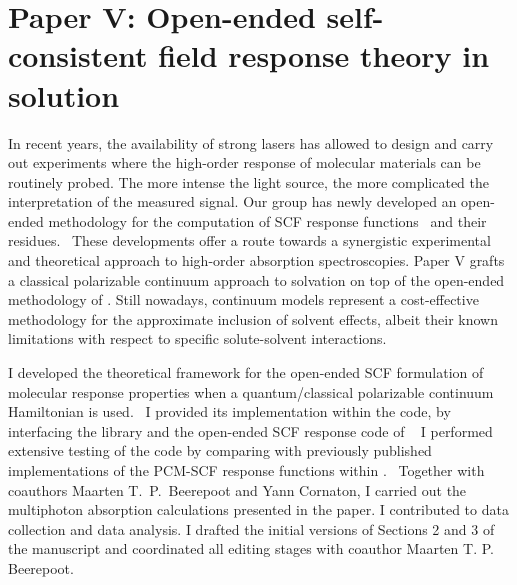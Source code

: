 \section*{Paper V: Open-ended self-consistent field response theory in solution}

In recent years, the availability of strong lasers has allowed to
design and carry out experiments where the high-order response of
molecular materials can be routinely probed.
The more intense the light source, the more complicated the interpretation of
the measured signal.
Our group has newly developed an open-ended methodology for the computation of
\acs{SCF} response functions~\autocite{Thorvaldsen2008-sg, Ringholm2014-gx} and
their residues.~\autocite{Friese2015-kb}
These developments offer a route towards a synergistic experimental and
theoretical approach to high-order absorption spectroscopies.
Paper V grafts a classical polarizable continuum approach to solvation on top
of the open-ended methodology of \citeauthor{Thorvaldsen2008-sg}.
Still nowadays, continuum models represent a cost-effective methodology for the
approximate inclusion of solvent effects, albeit their known limitations with respect
to specific solute-solvent interactions.

I developed the theoretical framework for the open-ended \acs{SCF} formulation
of molecular response properties when a quantum/classical polarizable continuum
Hamiltonian is used.~\autocite{Thorvaldsen2008-sg, Lipparini2010-be}
I provided its implementation within the \DALTON code, by interfacing the
\pcmsolver library and the open-ended \acs{SCF} response code of
\citeauthor{Ringholm2014-gx}~\autocite{Ringholm2014-gx, Friese2015-kb}
I performed extensive testing of the code by comparing with previously
published implementations of the \acs{PCM}-\acs{SCF} response functions within
\DALTON.~\autocite{Cammi2003-qy, Frediani2005-nc, Ferrighi2010-pm}
Together with coauthors Maarten T.~P.~Beerepoot and Yann Cornaton, I carried out
the multiphoton absorption calculations presented in the paper. I contributed
to data collection and data analysis.
I drafted the initial versions of Sections 2 and 3 of the manuscript and coordinated all
editing stages with coauthor Maarten T. P. Beerepoot.
